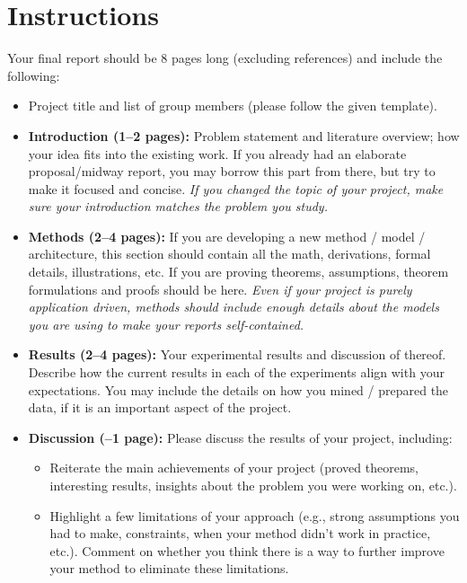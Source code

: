 \section*{Instructions}

Your final report should be 8 pages long (excluding references) and include the following:

\begin{itemize}[leftmargin=2em]
    \item Project title and list of group members (please follow the given template).

    \item \textbf{Introduction (1--2 pages):}
    Problem statement and literature overview; how your idea fits into the existing work.
    If you already had an elaborate proposal/midway report, you may borrow this part from there, but try to make it focused and concise.
    \emph{If you changed the topic of your project, make sure your introduction matches the problem you study.}


    \item \textbf{Methods (2--4 pages):}
    If you are developing a new method / model / architecture, this section should contain all the math, derivations, formal details, illustrations, etc.
    If you are proving theorems, assumptions, theorem formulations and proofs should be here.
    \emph{Even if your project is purely application driven, methods should include enough details about the models you are using to make your reports self-contained.}

    \item \textbf{Results (2--4 pages):}
    Your experimental results and discussion of thereof.
    Describe how the current results in each of the experiments align with your expectations.
    You may include the details on how you mined / prepared the data, if it is an important aspect of the project.

    \item \textbf{Discussion (--1 page):}
    Please discuss the results of your project, including:
    \begin{itemize}
        \item Reiterate the main achievements of your project (proved theorems, interesting results, insights about the problem you were working on, etc.).
        \item Highlight a few limitations of your approach (e.g., strong assumptions you had to make, constraints, when your method didn't work in practice, etc.). Comment on whether you think there is a way to further improve your method to eliminate these limitations.
    \end{itemize}
\end{itemize}

